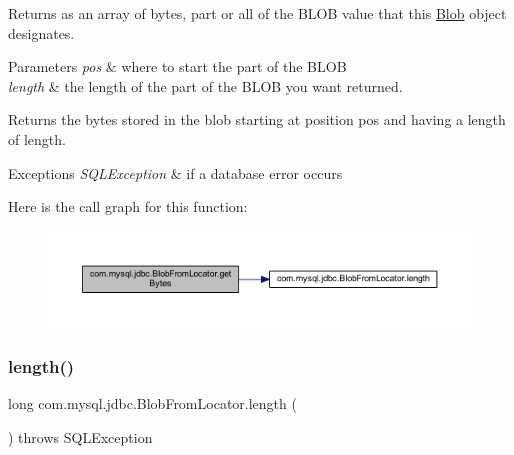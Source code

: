 Returns as an array of bytes, part or all of the B\+L\+OB value that this \mbox{\hyperlink{classcom_1_1mysql_1_1jdbc_1_1_blob}{Blob}} object designates.


\begin{DoxyParams}{Parameters}
{\em pos} & where to start the part of the B\+L\+OB \\
\hline
{\em length} & the length of the part of the B\+L\+OB you want returned.\\
\hline
\end{DoxyParams}
\begin{DoxyReturn}{Returns}
the bytes stored in the blob starting at position {\ttfamily pos} and having a length of {\ttfamily length}.
\end{DoxyReturn}

\begin{DoxyExceptions}{Exceptions}
{\em S\+Q\+L\+Exception} & if a database error occurs \\
\hline
\end{DoxyExceptions}
Here is the call graph for this function\+:\nopagebreak
\begin{figure}[H]
\begin{center}
\leavevmode
\includegraphics[width=350pt]{classcom_1_1mysql_1_1jdbc_1_1_blob_from_locator_ab3fbef493872180d7665934bfd5eeaa0_cgraph}
\end{center}
\end{figure}
\mbox{\label{classcom_1_1mysql_1_1jdbc_1_1_blob_from_locator_a9fc208b550f8dfde5f07b1762e5db586}} 
\subsubsection{\texorpdfstring{length()}{length()}}
{\footnotesize\ttfamily long com.\+mysql.\+jdbc.\+Blob\+From\+Locator.\+length (\begin{DoxyParamCaption}{ }\end{DoxyParamCaption}) throws S\+Q\+L\+Exception}

